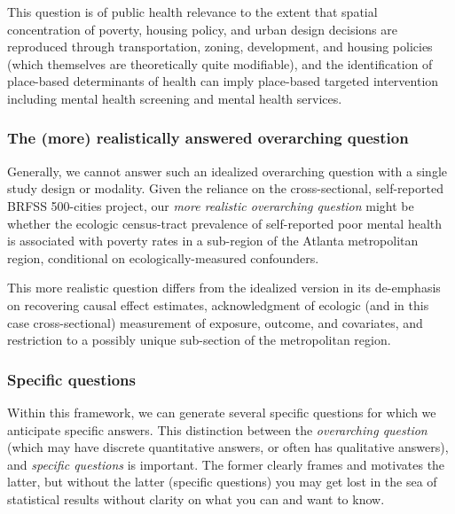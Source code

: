 \documentclass[
]{book}
\newenvironment{rmdnote}[1]
  {
  \begin{itemize}
  \renewcommand{\labelitemi}{
    \raisebox{-.7\height}[0pt][0pt]{
      {\setkeys{Gin}{width=3em,keepaspectratio}\texttt{[image: images/\#1]}}
    }
  }
  \setlength{\fboxsep}{1em}
  \begin{note}
  \item
  }
  {
  \end{note}
  \end{itemize}
  }
\begin{document}
This question is of public health relevance to the extent that spatial concentration of poverty, housing policy, and urban design decisions are reproduced through transportation, zoning, development, and housing policies (which themselves are theoretically quite modifiable), and the identification of place-based determinants of health can imply place-based targeted intervention including mental health screening and mental health services.

\hypertarget{the-more-realistically-answered-overarching-question}{%
\subsubsection{The (more) realistically answered overarching question}\label{the-more-realistically-answered-overarching-question}}

Generally, we cannot answer such an idealized overarching question with a single study design or modality. Given the reliance on the cross-sectional, self-reported BRFSS 500-cities project, our \emph{more realistic overarching question} might be whether the ecologic census-tract prevalence of self-reported poor mental health is associated with poverty rates in a sub-region of the Atlanta metropolitan region, conditional on ecologically-measured confounders.

\begin{rmdnote}{note}
This more realistic question differs from the idealized version in its de-emphasis on recovering causal effect estimates, acknowledgment of ecologic (and in this case cross-sectional) measurement of exposure, outcome, and covariates, and restriction to a possibly unique sub-section of the metropolitan region.

\end{rmdnote}

\hypertarget{specific-questions}{%
\subsubsection{Specific questions}\label{specific-questions}}

Within this framework, we can generate several specific questions for which we anticipate specific answers. This distinction between the \emph{overarching question} (which may have discrete quantitative answers, or often has qualitative answers), and \emph{specific questions} is important. The former clearly frames and motivates the latter, but without the latter (specific questions) you may get lost in the sea of statistical results without clarity on what you can and want to know.
\end{document}
